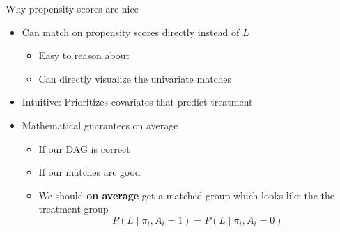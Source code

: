 \documentclass{beamer}
\newcommand\bblue[1]{\textcolor{blue}{\textbf{#1}}}
\begin{document}
\begin{frame}{Why propensity scores are nice} \pause

\begin{itemize}
\item Can match on propensity scores directly instead of $L$\pause
\begin{itemize}
\item Easy to reason about \pause
\item Can directly visualize the univariate matches
\end{itemize} \pause
\item Intuitive: Prioritizes covariates that predict treatment
\item Mathematical guarantees on average \pause
\begin{itemize}
    \item If our DAG is correct \pause 
    \item If our matches are good \pause
    \item We should \textbf{on average} get a matched group which looks like the the treatment group
    \[P(L \mid \pi_i, A_i = 1) = P(L \mid \pi_i, A_i = 0)\]
\end{itemize}
\end{itemize}

\end{frame}




\end{document}
